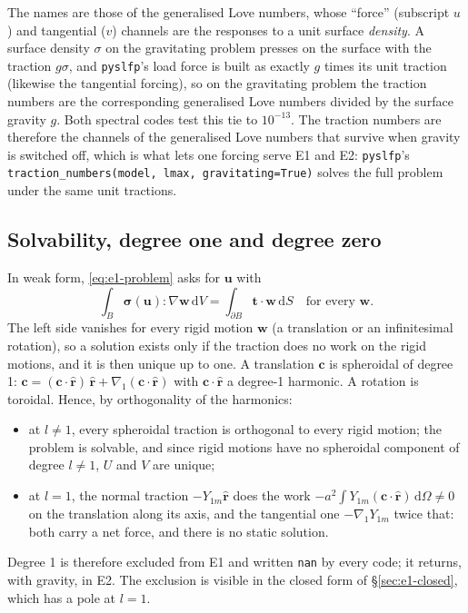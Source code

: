 \documentclass[11pt]{article}
\numberwithin{equation}{section}
\newcommand{\dS}{\,\mathrm{d}S}
\newcommand{\dV}{\,\mathrm{d}V}
\newcommand{\vu}{\mathbf{u}}
\newcommand{\vw}{\mathbf{w}}
\newcommand{\vt}{\mathbf{t}}
\newcommand{\rhat}{\hat{\mathbf{r}}}
\newcommand{\code}[1]{\texttt{#1}}
\newcommand{\gradone}{\nabla_{1}}
\newcommand{\bsig}{\bm{\sigma}}
\begin{document}
The names are those of the generalised Love numbers, whose ``force''
(subscript $u$) and tangential ($v$) channels are the responses to a unit
surface \emph{density}. A surface density $\sigma$ on the gravitating problem
presses on the surface with the traction $g\sigma$, and \code{pyslfp}'s load
force is built as exactly $g$ times its unit traction (likewise the
tangential forcing), so on the gravitating problem the traction numbers are
the corresponding generalised Love numbers divided by the surface gravity
$g$. Both spectral codes test this tie to $10^{-13}$. The traction numbers
are therefore the channels of the generalised Love numbers that survive
when gravity is switched off, which is what lets one forcing serve E1 and
E2: \code{pyslfp}'s \code{traction\_numbers(model, lmax,
gravitating=True)} solves the full problem under the same unit tractions.

\subsection{Solvability, degree one and degree zero}
\label{sec:e1-solvability}

In weak form, \eqref{eq:e1-problem} asks for $\vu$ with
\begin{equation}
  \int_B \bsig(\vu):\nabla\vw\dV = \int_{\partial B}\vt\cdot\vw\dS
  \quad\text{for every } \vw .
\end{equation}
The left side vanishes for every rigid motion $\vw$ (a translation or an
infinitesimal rotation), so a solution exists only if the traction does no
work on the rigid motions, and it is then unique up to one. A translation
$\mathbf{c}$ is spheroidal of degree 1:
$\mathbf{c} = (\mathbf{c}\cdot\rhat)\,\rhat + \gradone(\mathbf{c}\cdot\rhat)$
with $\mathbf{c}\cdot\rhat$ a degree-1 harmonic. A rotation is toroidal.
Hence, by orthogonality of the harmonics:
\begin{itemize}[leftmargin=*]
\item at $l\ne1$, every spheroidal traction is orthogonal to every rigid
  motion; the problem is solvable, and since rigid motions have no
  spheroidal component of degree $l\ne1$, $U$ and $V$ are unique;
\item at $l=1$, the normal traction $-Y_{1m}\rhat$ does the work
  $-a^2\int Y_{1m}(\mathbf{c}\cdot\rhat)\,\mathrm{d}\Omega\ne0$ on the
  translation along its axis, and the tangential one $-\gradone Y_{1m}$
  twice that: both carry a net force, and there is no static solution.
\end{itemize}
Degree 1 is therefore excluded from E1 and written \code{nan} by every code;
it returns, with gravity, in E2. The exclusion is visible in the closed
form of \S\ref{sec:e1-closed}, which has a pole at $l=1$.
\end{document}
